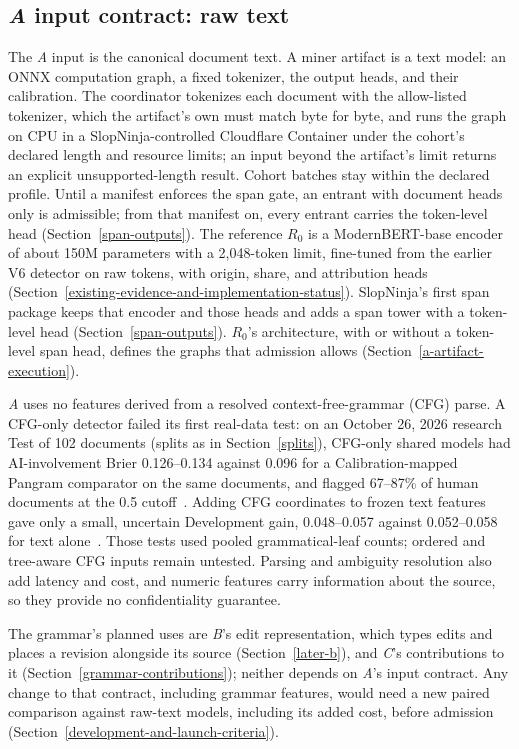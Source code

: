 \subsection{\textit{A} input contract: raw text}\label{input-contract}

The \textit{A} input is the canonical document text. A miner artifact is a
text model: an ONNX computation graph, a fixed tokenizer, the output heads, and
their calibration. The coordinator tokenizes each document with the
allow-listed tokenizer, which the artifact's own must match byte for byte, and
runs the graph on CPU in a SlopNinja-controlled Cloudflare
Container under the cohort's declared length and resource limits; an input beyond the artifact's limit returns an explicit
unsupported-length result. Cohort batches stay within the declared profile.
Until a manifest enforces the span gate, an entrant with document heads only
is admissible; from that manifest on, every entrant carries the token-level
head (Section~\ref{span-outputs}).
The reference \(R_0\) is a ModernBERT-base encoder~\cite{modernbert} of
about 150M parameters with a 2,048-token limit, fine-tuned from the earlier V6
detector on raw tokens, with origin, share, and attribution heads
(Section~\ref{existing-evidence-and-implementation-status}). SlopNinja's
first span package keeps that encoder and those heads and adds a span tower
with a token-level head (Section~\ref{span-outputs}). \(R_0\)'s architecture,
with or without a token-level span head, defines the graphs that admission
allows (Section~\ref{a-artifact-execution}).

\textit{A} uses no features derived from a resolved context-free-grammar (CFG)
parse. A CFG-only detector failed its first real-data test: on an October 26,
2026 research Test of 102 documents
(splits as in Section~\ref{splits}),
CFG-only shared models had AI-involvement Brier 0.126--0.134 against 0.096 for a
Calibration-mapped Pangram comparator on the same documents, and flagged
67--87\% of human documents at the 0.5
cutoff~\cite{cfgviability}. Adding CFG coordinates to frozen text features gave
only a small, uncertain Development gain, 0.048--0.057 against 0.052--0.058 for
text alone~\cite{v6cfgfusion}. Those tests used pooled grammatical-leaf counts;
ordered and tree-aware CFG inputs remain untested. Parsing and ambiguity
resolution also add latency and cost, and numeric features carry information
about the source, so they provide no confidentiality guarantee.

The grammar's planned uses are \textit{B}'s edit representation, which types
edits and places a revision alongside its source (Section~\ref{later-b}), and
\textit{C}'s contributions to it (Section~\ref{grammar-contributions}); neither
depends on \textit{A}'s input contract. Any change to that contract, including
grammar features, would need a new paired comparison against raw-text models,
including its added cost, before admission
(Section~\ref{development-and-launch-criteria}).

